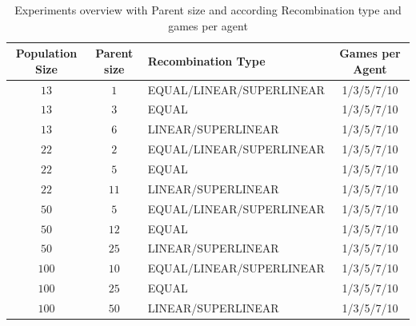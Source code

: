 \begin{table}[H]
\centering
\begin{tabular}{c c l c}
Population Size & Parent size & Recombination Type & Games per Agent\\
\hline
$13$ & $1$ & EQUAL/LINEAR/SUPERLINEAR & 1/3/5/7/10\\
$13$ & $3$ & EQUAL & 1/3/5/7/10\\
$13$ & $6$ & LINEAR/SUPERLINEAR & 1/3/5/7/10\\
$22$ & $2$ & EQUAL/LINEAR/SUPERLINEAR & 1/3/5/7/10\\
$22$ & $5$ & EQUAL & 1/3/5/7/10\\
$22$ & $11$ & LINEAR/SUPERLINEAR & 1/3/5/7/10\\
$50$ & $5$ & EQUAL/LINEAR/SUPERLINEAR & 1/3/5/7/10\\
$50$ & $12$ & EQUAL & 1/3/5/7/10\\
$50$ & $25$ & LINEAR/SUPERLINEAR & 1/3/5/7/10\\
$100$ & $10$ & EQUAL/LINEAR/SUPERLINEAR & 1/3/5/7/10\\
$100$ & $25$ & EQUAL & 1/3/5/7/10\\
$100$ & $50$ & LINEAR/SUPERLINEAR & 1/3/5/7/10
\end{tabular}
\caption{Experiments overview with Parent size and according Recombination type and games per agent\label{SuperCMAExperimentAppendix}}
\end{table}




\clearpage

